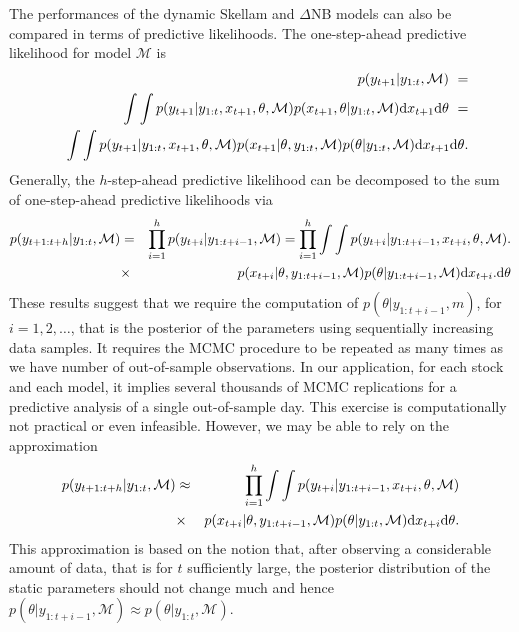 \documentclass[12pt]{article}
\newcommand{\dd}{{\rm d}}
\begin{document}
The performances of the dynamic Skellam and $\Delta$NB models can also be compared
in terms of predictive likelihoods.
The one-step-ahead predictive likelihood for model $\mathcal{M}$ is 
\begin{eqnarray}
& & p(y_{t+1}|y_{1:t},\mathcal{M}) \ = \nonumber  \\
& & \int \int  p(y_{t+1}|y_{1:t},x_{t+1}, \theta,\mathcal{M})p( x_{t+1}, \theta|y_{1:t},\mathcal{M}) \dd x_{t+1} \dd \theta  \ = \nonumber \\
& & \int \int  p(y_{t+1}|y_{1:t},x_{t+1}, \theta,\mathcal{M})p( x_{t+1}| \theta , y_{1:t},\mathcal{M})p( \theta | y_{1:t},\mathcal{M}) \dd x_{t+1} \dd \theta.
\end{eqnarray}
Generally, the $h$-step-ahead predictive likelihood can be decomposed to the sum
of one-step-ahead predictive likelihoods via
\begin{eqnarray}
p(y_{t+1:t+h}|y_{1:t},\mathcal{M})
&=&\prod \limits_{i=1}^{h} p(y_{t+i}|y_{1:t+i-1},\mathcal{M})= \prod \limits_{i=1}^{h} \int \int  p(y_{t+i}|y_{1:t+i-1},x_{t+i}, \theta,\mathcal{M}).\nonumber  \\
&\times&  p( x_{t+i}| \theta , y_{1:t+i-1},\mathcal{M})p( \theta | y_{1:t+i-1},\mathcal{M}) \dd x_{t+i}. \dd \theta 
\end{eqnarray}
These results suggest that we require the computation of $p( \theta | y_{1:t+i-1},m)$,
for $i=1,2,\ldots$,
that is the posterior of the parameters using sequentially increasing data samples.
It requires the MCMC procedure to be repeated as many times as we have number of
out-of-sample observations.
In our application, for each stock and each model, it implies several thousands
of MCMC replications for a predictive analysis of a single out-of-sample day.
This exercise is computationally not practical or even infeasible.
However, we may be able to rely on the approximation
\begin{eqnarray}
p(y_{t+1:t+h}|y_{1:t},\mathcal{M})&\approx&\prod \limits_{i=1}^{h} \int \int  p(y_{t+i}|y_{1:t+i-1},x_{t+i}, \theta,\mathcal{M})\nonumber \\
&\times &p( x_{t+i}| \theta , y_{1:t+i-1},\mathcal{M})p( \theta | y_{1:t},\mathcal{M}) \dd x_{t+i} \dd \theta.
\end{eqnarray}
This approximation is based on the notion that,
after observing a considerable amount of data,
that is for $t$ sufficiently large,
the posterior distribution of the static parameters should not change much and
hence $p( \theta | y_{1:t+i-1},\mathcal{M}) \approx p( \theta | y_{1:t},\mathcal{M})$.
\end{document}
